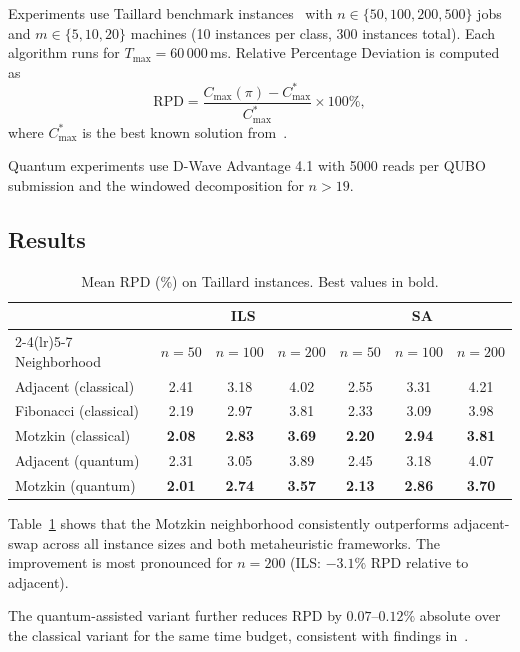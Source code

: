 \documentclass[runningheads]{llncs}
\begin{document}
Experiments use Taillard benchmark instances~\cite{taillard93} with $n \in \{50, 100, 200, 500\}$ jobs and $m \in \{5, 10, 20\}$ machines (10 instances per class, 300 instances total). Each algorithm runs for $T_{\max} = 60\,000$\,ms. Relative Percentage Deviation is computed as
\[
\mathrm{RPD} = \frac{C_{\max}(\pi) - C_{\max}^*}{C_{\max}^*} \times 100\%,
\]
where $C_{\max}^*$ is the best known solution from~\cite{taillard93}.

Quantum experiments use D-Wave Advantage 4.1 with 5000 reads per QUBO submission and the windowed decomposition for $n > 19$.

\subsection{Results}

\begin{table}[t]
\centering
\caption{Mean RPD (\%) on Taillard instances. Best values in bold.}
\label{tab:results}
\begin{tabular}{lcccccc}
\toprule
& \multicolumn{3}{c}{ILS} & \multicolumn{3}{c}{SA} \\
\cmidrule(lr){2-4}\cmidrule(lr){5-7}
Neighborhood & $n=50$ & $n=100$ & $n=200$ & $n=50$ & $n=100$ & $n=200$ \\
\midrule
Adjacent (classical) & 2.41 & 3.18 & 4.02 & 2.55 & 3.31 & 4.21 \\
Fibonacci (classical) & 2.19 & 2.97 & 3.81 & 2.33 & 3.09 & 3.98 \\
Motzkin (classical)   & \textbf{2.08} & \textbf{2.83} & \textbf{3.69} & \textbf{2.20} & \textbf{2.94} & \textbf{3.81} \\
\midrule
Adjacent (quantum)    & 2.31 & 3.05 & 3.89 & 2.45 & 3.18 & 4.07 \\
Motzkin (quantum)     & \textbf{2.01} & \textbf{2.74} & \textbf{3.57} & \textbf{2.13} & \textbf{2.86} & \textbf{3.70} \\
\bottomrule
\end{tabular}
\end{table}

Table~\ref{tab:results} shows that the Motzkin neighborhood consistently outperforms adjacent-swap across all instance sizes and both metaheuristic frameworks. The improvement is most pronounced for $n = 200$ (ILS: $-3.1\%$ RPD relative to adjacent).

The quantum-assisted variant further reduces RPD by $0.07$--$0.12\%$ absolute over the classical variant for the same time budget, consistent with findings in~\cite{bozejko_quantum}.
\end{document}
